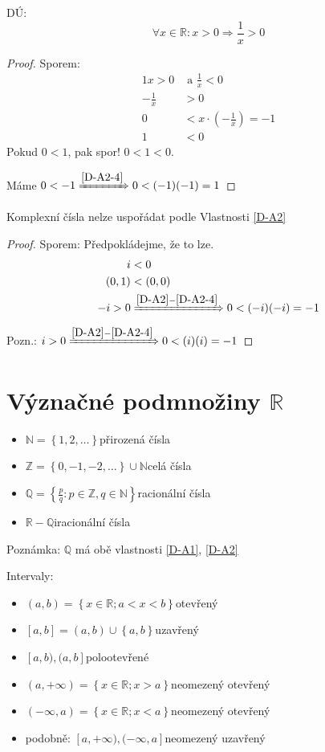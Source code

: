 DÚ:
\begin{equation}
	\forall x \in \mathbb{R}: x>0 \Rightarrow \frac{1}{x}>0
\end{equation}
\begin{proof}
	Sporem:
	\begin{alignat*}{1}
		x>0 &\text{ a } \frac{1}{x}<0 \\
		-\frac{1}{x}&>0 \\
		0&<x\cdot\left(-\frac{1}{x}\right) = -1 \\
		1 &< 0
	\end{alignat*}
	Pokud $0<1$, pak spor! $0<1<0$.

	Máme $0<-1 \xRightarrow{\ref{D-A2-4}} 0<(-1)(-1) = 1$
\end{proof}

\begin{example}
	Komplexní čísla nelze uspořádat podle Vlastnosti \ref{D-A2}
\end{example}
\begin{proof}
	Sporem: Předpokládejme, že to lze.
	\begin{alignat*}{1}
		i&<0 \\
		(0,1)&<(0,0) \\
		-i>0 &\xRightarrow{\ref*{D-A2}-\ref{D-A2-4}} 0<(-i)(-i) = -1
	\end{alignat*}
	Pozn.: $i>0 \xRightarrow{\ref*{D-A2}-\ref{D-A2-4}} 0<(i)(i) = -1$
\end{proof}

\section{Význačné podmnožiny \texorpdfstring{$\mathbb{R}$}{R}}
\begin{itemize}
	\item $\mathbb{N} = \left\{1,2,\dots\right\}$\quad přirozená čísla
	\item $\mathbb{Z} = \left\{0,-1,-2,\dots\right\}\cup\mathbb{N}$\quad celá čísla
	\item $\mathbb{Q} = \left\{\frac{p}{q}: p\in\mathbb{Z}, q\in\mathbb{N}\right\}$\quad racionální čísla
	\item $\mathbb{R} - \mathbb{Q}$\quad iracionální čísla
\end{itemize}

Poznámka: $\mathbb{Q}$ má obě vlastnosti \ref{D-A1}, \ref{D-A2}

Intervaly:
\begin{itemize}
	\item $(a,b) = \left\{x\in\mathbb{R}; a<x<b\right\}$\quad otevřený
	\item $[a,b] = (a,b)\cup\left\{a,b\right\}$\quad uzavřený
	\item $[a,b), (a,b]$\quad polootevřené
	\item $(a,+\infty) = \left\{x\in\mathbb{R}; x>a\right\}$\quad neomezený otevřený
	\item $(-\infty, a) = \left\{x\in\mathbb{R}; x<a\right\}$\quad neomezený otevřený
	\item podobně: $[a, +\infty), (-\infty, a]$\quad neomezený uzavřený
\end{itemize}

